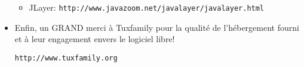 \begin{itemize}
\begin{itemize}
\vspace{0.2cm}
 \item JLayer: \texttt{http://www.javazoom.net/javalayer/javalayer.html} \\
\end{itemize}
\vspace{0.2cm}
\item Enfin, un GRAND merci à Tuxfamily pour la qualité de l'hébergement fourni et à leur engagement envers le logiciel libre!
\begin{center}
 \texttt{http://www.tuxfamily.org}
\end{center}
\end{itemize}